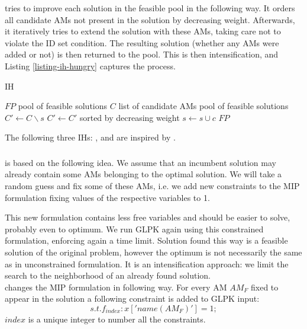  tries to improve each solution in the feasible pool in the following way. It orders all candidate AMs not present in the solution by decreasing weight. Afterwards, it iteratively tries to extend the solution with these AMs, taking care not to violate the ID set condition. The resulting solution (whether any AMs were added or not) is then returned to the pool. This is then intensification, and Listing \ref{listing-ih-hungry} captures the process.\\

\begin{algorithm}
\caption{ IH}
\label{listing-ih-hungry}
\begin{algorithmic}
\REQUIRE $FP$ pool of feasible solutions
\REQUIRE $C$ list of candidate AMs
\ENSURE pool of feasible solutions
  \STATE {}
  \STATE $C' \gets C \backslash s$
  \STATE $C' \gets C'$ sorted by decreasing weight
      \STATE $s \gets s \cup c$
    \ENDIF
  \ENDFOR
\ENDFOR
\RETURN $FP$
\end{algorithmic}
\end{algorithm}

The following three IHs: ,  and  are inspired by \cite{heu-lecture}.

\subsubsection{}

 is based on the following idea. We assume that an incumbent solution may already contain some AMs belonging to the optimal solution. We will take a random guess and fix some of these AMs, i.e. we add new constraints to the MIP formulation fixing values of the respective variables to 1.

This new formulation contains less free variables and should be easier to solve, probably even to optimum. We run GLPK again using this constrained formulation, enforcing again a time limit. Solution found this way is a feasible solution of the original problem, however the optimum is not necessarily the same as in unconstrained formulation. It is an intensification approach: we limit the search to the neighborhood of an already found solution.\\

 changes the MIP formulation in following way. For every AM $AM_F$ fixed to appear in the solution a following constraint is added to GLPK input:
\[s.t. f_{index}: x['name(AM_F)'] = 1;\]
$index$ is a unique integer to number all the constraints.

